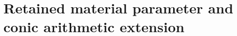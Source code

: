 \documentclass[11pt,a4paper]{article}
\begin{document}
\section{Retained material parameter and conic arithmetic extension}

\end{document}
